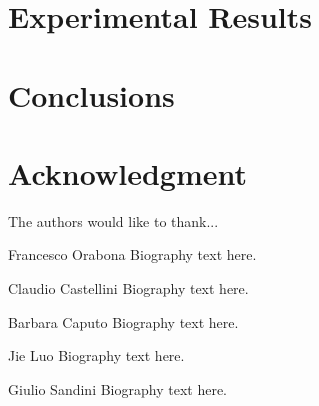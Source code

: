\documentclass[9.5pt,journal,a4paper,twocolumn]{IEEEtran}
\begin{document}
\section{Experimental Results}
\label{sec:exp}



\section{Conclusions}
\label{sec:concl}


\section*{Acknowledgment}
The authors would like to thank...


{\small


}


\begin{biography}{Francesco Orabona}
Biography text here.
\end{biography}

\begin{biography}{Claudio Castellini}
Biography text here.
\end{biography}

\begin{biography}{Barbara Caputo}
Biography text here.
\end{biography}

\begin{biography}{Jie Luo}
Biography text here.
\end{biography}

\begin{biography}{Giulio Sandini}
Biography text here.
\end{biography}
\end{document}
